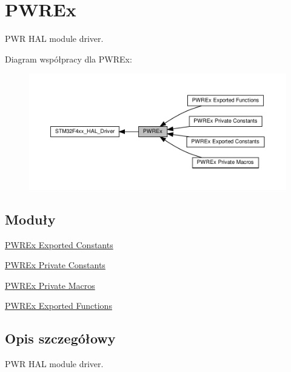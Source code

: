 \hypertarget{group___p_w_r_ex}{}\section{P\+W\+R\+Ex}
\label{group___p_w_r_ex}


P\+WR H\+AL module driver.  


Diagram współpracy dla P\+W\+R\+Ex\+:\nopagebreak
\begin{figure}[H]
\begin{center}
\leavevmode
\includegraphics[width=350pt]{group___p_w_r_ex}
\end{center}
\end{figure}
\subsection*{Moduły}
\begin{DoxyCompactItemize}
\item 
\hyperlink{group___p_w_r_ex___exported___constants}{P\+W\+R\+Ex Exported Constants}
\item 
\hyperlink{group___p_w_r_ex___private___constants}{P\+W\+R\+Ex Private Constants}
\item 
\hyperlink{group___p_w_r_ex___private___macros}{P\+W\+R\+Ex Private Macros}
\item 
\hyperlink{group___p_w_r_ex___exported___functions}{P\+W\+R\+Ex Exported Functions}
\end{DoxyCompactItemize}


\subsection{Opis szczegółowy}
P\+WR H\+AL module driver. 

